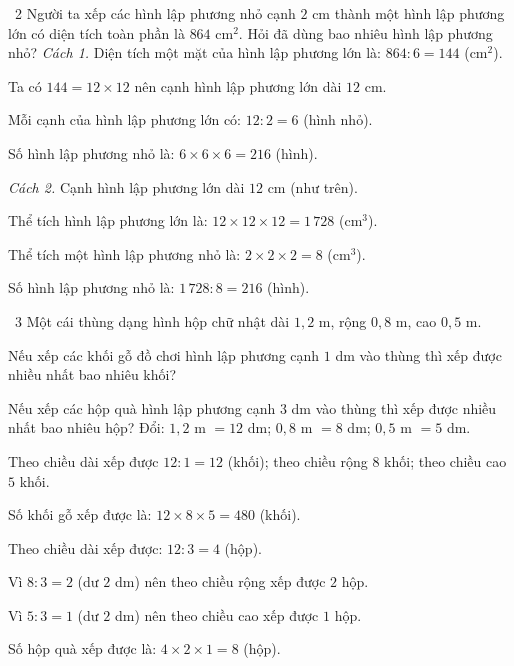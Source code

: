 \begin{exbox}{\ExWord\ 2}
Người ta xếp các hình lập phương nhỏ cạnh $2$ cm thành một hình lập phương lớn có diện tích toàn phần là $864$ cm$^2$. Hỏi đã dùng bao nhiêu hình lập phương nhỏ?
\guide
\emph{Cách 1.} Diện tích một mặt của hình lập phương lớn là: $864:6=144$ (cm$^2$).\par
Ta có $144=12\times12$ nên cạnh hình lập phương lớn dài $12$ cm.\par
Mỗi cạnh của hình lập phương lớn có: $12:2=6$ (hình nhỏ).\par
Số hình lập phương nhỏ là: $6\times6\times6=216$ (hình).\par
\emph{Cách 2.} Cạnh hình lập phương lớn dài $12$ cm (như trên).\par
Thể tích hình lập phương lớn là: $12\times12\times12=1\,728$ (cm$^3$).\par
Thể tích một hình lập phương nhỏ là: $2\times2\times2=8$ (cm$^3$).\par
Số hình lập phương nhỏ là: $1\,728:8=216$ (hình).
\end{exbox}
\gap
\begin{exbox}{\ExWord\ 3}
Một cái thùng dạng hình hộp chữ nhật dài $1{,}2$ m, rộng $0{,}8$ m, cao $0{,}5$ m.\par
{} Nếu xếp các khối gỗ đồ chơi hình lập phương cạnh $1$ dm vào thùng thì xếp được nhiều nhất bao nhiêu khối?\par
{} Nếu xếp các hộp quà hình lập phương cạnh $3$ dm vào thùng thì xếp được nhiều nhất bao nhiêu hộp?
\guide
Đổi: $1{,}2$ m $=12$ dm; $0{,}8$ m $=8$ dm; $0{,}5$ m $=5$ dm.\par
{} Theo chiều dài xếp được $12:1=12$ (khối); theo chiều rộng $8$ khối; theo chiều cao $5$ khối.\par
Số khối gỗ xếp được là: $12\times8\times5=480$ (khối).\par
{} Theo chiều dài xếp được: $12:3=4$ (hộp).\par
Vì $8:3=2$ (dư $2$ dm) nên theo chiều rộng xếp được $2$ hộp.\par
Vì $5:3=1$ (dư $2$ dm) nên theo chiều cao xếp được $1$ hộp.\par
Số hộp quà xếp được là: $4\times2\times1=8$ (hộp).
\end{exbox}
\gap
